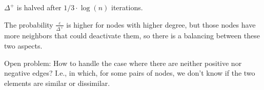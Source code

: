 \begin{thm}
    $\Delta^+$ is halved after $1/3 \cdot \log(n)$ iterations.
\end{thm}

\obs The probability $\frac{\varepsilon}{\Delta^+}$ is higher for nodes with higher degree, but those nodes have more neighbors that could deactivate them, so there is a balancing between these two aspects.

Open problem: How to handle the case where there are neither positive nor negative edges? I.e., in which, for some pairs of nodes, we don't know if the two elements are similar or dissimilar.
